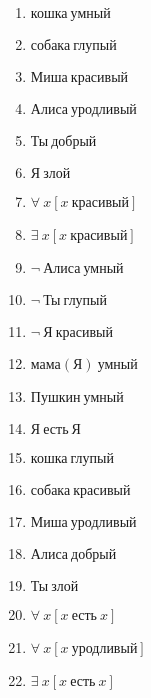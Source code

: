 \documentclass{article}
\begin{document}
\begin{enumerate}
\item $\text{кошка} \ \text{умный}$

\item $\text{собака} \ \text{глупый}$

\item $\text{Миша} \ \text{красивый}$

\item $\text{Алиса} \ \text{уродливый}$

\item $\text{Ты} \ \text{добрый}$

\item $\text{Я} \ \text{злой}$

\item $\forall \ x[x \ \text{красивый}]$

\item $\exists \ x[x \ \text{красивый}]$

\item $\neg \ \text{Алиса} \ \text{умный}$

\item $\neg \ \text{Ты} \ \text{глупый}$

\item $\neg \ \text{Я} \ \text{красивый}$

\item $\text{мама}(\text{Я}) \ \text{умный}$

\item $\text{Пушкин} \ \text{умный}$

\item $\text{Я} \ \text{есть} \ \text{Я}$

\item $\text{кошка} \ \text{глупый}$

\item $\text{собака} \ \text{красивый}$

\item $\text{Миша} \ \text{уродливый}$

\item $\text{Алиса} \ \text{добрый}$

\item $\text{Ты} \ \text{злой}$

\item $\forall \ x[x \ \text{есть} \ x]$

\item $\forall \ x[x \ \text{уродливый}]$

\item $\exists \ x[x \ \text{есть} \ x]$


\end{enumerate}
\end{document}
